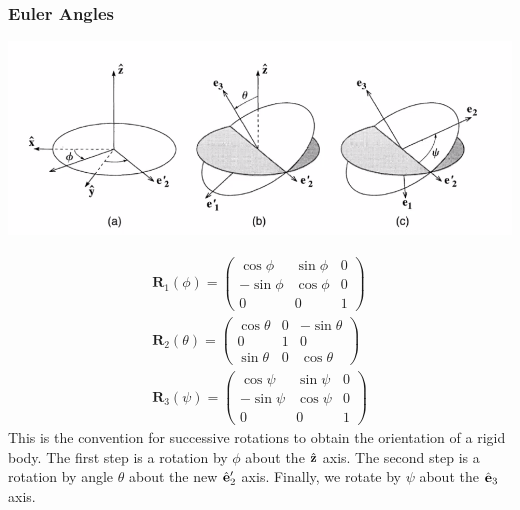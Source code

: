 \subsubsection{Euler Angles}
\begin{center}
    \includegraphics[scale=00.7]{Lecture-34/l34-img6.png}
\end{center}
\[
\begin{array}{c}
\mathbf{R}_{1}(\phi)=\left(\begin{array}{ccc}
\cos \phi & \sin \phi & 0 \\
-\sin \phi & \cos \phi & 0 \\
0 & 0 & 1
\end{array}\right) \\
\mathbf{R}_{2}(\theta)=\left(\begin{array}{ccc}
\cos \theta & 0 & -\sin \theta \\
0 & 1 & 0 \\
\sin \theta & 0 & \cos \theta
\end{array}\right) \\
\mathbf{R}_{3}(\psi)=\left(\begin{array}{ccc}
\cos \psi & \sin \psi & 0 \\
-\sin \psi & \cos \psi & 0 \\
0 & 0 & 1
\end{array}\right)
\end{array}
\]
This is the convention for successive rotations to obtain the orientation of a rigid body. The first step is a rotation by $\phi$ about the $\hat{\mathbf{z}}$ axis. The second step is a rotation by angle $\theta$ about the new $\hat{\mathbf{e}}'_2$ axis. Finally, we rotate by $\psi$ about the $\hat{\mathbf{e}}_3$ axis. 
